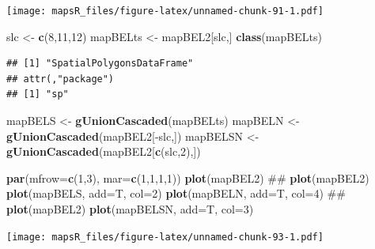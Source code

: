 \documentclass[]{report}
\newenvironment{Shaded}{\begin{snugshade}}{\end{snugshade}}
\newcommand{\KeywordTok}[1]{\textcolor[rgb]{0.13,0.29,0.53}{\textbf{{#1}}}}
\newcommand{\DataTypeTok}[1]{\textcolor[rgb]{0.13,0.29,0.53}{{#1}}}
\newcommand{\DecValTok}[1]{\textcolor[rgb]{0.00,0.00,0.81}{{#1}}}
\newcommand{\StringTok}[1]{\textcolor[rgb]{0.31,0.60,0.02}{{#1}}}
\newcommand{\NormalTok}[1]{{#1}}
\begin{document}
\texttt{[image: mapsR\_files/figure-latex/unnamed-chunk-91-1.pdf]}

\begin{Shaded}
\begin{Highlighting}[]
\NormalTok{slc <-}\StringTok{ }\KeywordTok{c}\NormalTok{(}\DecValTok{8}\NormalTok{,}\DecValTok{11}\NormalTok{,}\DecValTok{12}\NormalTok{)}
\NormalTok{mapBELts <-}\StringTok{ }\NormalTok{mapBEL2[slc,]}
\KeywordTok{class}\NormalTok{(mapBELts)}
\end{Highlighting}
\end{Shaded}

\begin{verbatim}
## [1] "SpatialPolygonsDataFrame"
## attr(,"package")
## [1] "sp"
\end{verbatim}

\begin{Shaded}
\begin{Highlighting}[]
\NormalTok{mapBELS <-}\StringTok{ }\KeywordTok{gUnionCascaded}\NormalTok{(mapBELts)}
\NormalTok{mapBELN <-}\StringTok{ }\KeywordTok{gUnionCascaded}\NormalTok{(mapBEL2[-slc,])}
\NormalTok{mapBELSN <-}\StringTok{ }\KeywordTok{gUnionCascaded}\NormalTok{(mapBEL2[}\KeywordTok{c}\NormalTok{(slc,}\DecValTok{2}\NormalTok{),])}
\end{Highlighting}
\end{Shaded}

\begin{Shaded}
\begin{Highlighting}[]
\KeywordTok{par}\NormalTok{(}\DataTypeTok{mfrow=}\KeywordTok{c}\NormalTok{(}\DecValTok{1}\NormalTok{,}\DecValTok{3}\NormalTok{), }\DataTypeTok{mar=}\KeywordTok{c}\NormalTok{(}\DecValTok{1}\NormalTok{,}\DecValTok{1}\NormalTok{,}\DecValTok{1}\NormalTok{,}\DecValTok{1}\NormalTok{))}
\KeywordTok{plot}\NormalTok{(mapBEL2)}
\NormalTok{##}
\KeywordTok{plot}\NormalTok{(mapBEL2)}
\KeywordTok{plot}\NormalTok{(mapBELS, }\DataTypeTok{add=}\NormalTok{T, }\DataTypeTok{col=}\DecValTok{2}\NormalTok{)}
\KeywordTok{plot}\NormalTok{(mapBELN, }\DataTypeTok{add=}\NormalTok{T, }\DataTypeTok{col=}\DecValTok{4}\NormalTok{)}
\NormalTok{##}
\KeywordTok{plot}\NormalTok{(mapBEL2)}
\KeywordTok{plot}\NormalTok{(mapBELSN, }\DataTypeTok{add=}\NormalTok{T, }\DataTypeTok{col=}\DecValTok{3}\NormalTok{)}
\end{Highlighting}
\end{Shaded}

\texttt{[image: mapsR\_files/figure-latex/unnamed-chunk-93-1.pdf]}
\end{document}
